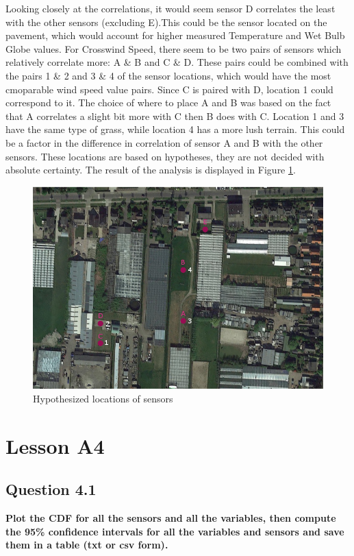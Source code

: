 \documentclass{report}
\begin{document}
	Looking closely at the correlations, it would seem sensor D correlates the least with the other sensors (excluding E).This could be the sensor located on the pavement, which would account for higher measured Temperature and Wet Bulb Globe values. For Crosswind Speed, there seem to be two pairs of sensors which relatively correlate more: A \& B and C \& D. These pairs could be combined with the pairs 1 \& 2 and 3 \& 4 of the sensor locations, which would have the most cmoparable wind speed value pairs. Since C is paired with D, location 1 could correspond to it. The choice of where to place A and B was based on the fact that A correlates a slight bit more with C then B does with C. Location 1 and 3 have the same type of grass, while location 4 has a more lush terrain. This could be a factor in the difference in correlation of sensor A and B with the other sensors. These locations are based on hypotheses, they are not decided with absolute certainty. The result of the analysis is displayed in Figure \ref{fig:locations}.
	
	\begin{figure}[H]
		\includegraphics[width=\linewidth]{GEO1001_hw01_images/SensorsSketch_guess.png}
		\caption{Hypothesized locations of sensors}
		\label{fig:locations}
	\end{figure}
	
	
	\section{Lesson A4}
	
	\subsection{Question 4.1}
	\textbf{Plot the CDF for all the sensors and all the variables, then compute the 95\% confidence intervals for all the variables and sensors and save them in a table (txt or csv form).}
	
\end{document}
